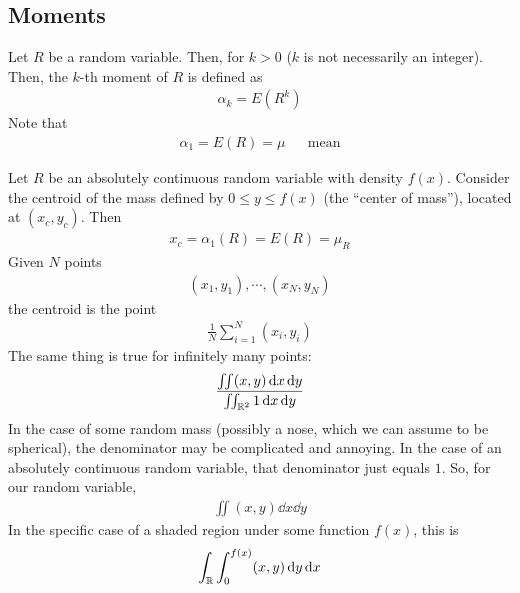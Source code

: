 \subsection{Moments}
\begin{definition}
    Let $R$ be a random variable. Then, for $k > 0$ ($k$ is not necessarily an integer). Then, the $k$-th moment of $R$ is defined as
    \begin{align}
        \alpha_k = E(R^k)
    \end{align}
    Note that
    \begin{align}
        \alpha_1 = E(R) = \mu && \text{mean}
    \end{align}
\end{definition}
Let $R$ be an absolutely continuous random variable with density $f(x)$. Consider the centroid of the mass defined by $0 \le y \le f(x)$ (the ``center of mass''), located at $(x_c, y_c)$. Then
\begin{align}
    x_c = \alpha_1(R) = E(R) = \mu_R
\end{align}
Given $N$ points
\begin{align}
    (x_1, y_1), \cdots, (x_N, y_N)
\end{align}
the centroid is the point 
\begin{align}
    \frac{1}{N} \sum_{i=1}^N (x_i, y_i)
\end{align}
The same thing is true for infinitely many points:
\begin{align}
    \frac{\iint (x,y) \dd{x}\dd{y}}{\iint_{\mathbb{R}^2} 1 \dd{x}\dd{y}}
\end{align}
In the case of some random mass (possibly a nose, which we can assume to be spherical), the denominator may be complicated and annoying. In the case of an absolutely continuous random variable, that denominator just equals $1$. So, for our random variable,
\begin{align}
    \iint (x,y) \dd{x}\dd{y}
\end{align}
In the specific case of a shaded region under some function $f(x)$, this is
\begin{align}
    \int_{\mathbb{R}} \int_0^{f(x)} (x,y) \dd{y}\dd{x}
\end{align}

